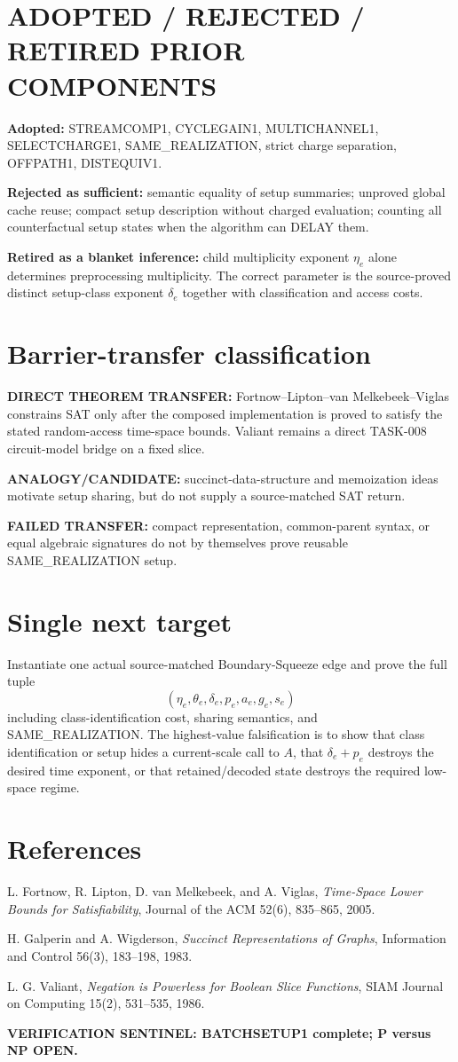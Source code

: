 \documentclass[11pt]{article}
\begin{document}
\section*{ADOPTED / REJECTED / RETIRED PRIOR COMPONENTS}
\textbf{Adopted:} STREAMCOMP1, CYCLEGAIN1, MULTICHANNEL1, SELECTCHARGE1, SAME\_REALIZATION, strict charge separation, OFFPATH1, DISTEQUIV1.

\textbf{Rejected as sufficient:} semantic equality of setup summaries; unproved global cache reuse; compact setup description without charged evaluation; counting all counterfactual setup states when the algorithm can DELAY them.

\textbf{Retired as a blanket inference:} child multiplicity exponent $\eta_e$ alone determines preprocessing multiplicity. The correct parameter is the source-proved distinct setup-class exponent $\delta_e$ together with classification and access costs.

\section*{Barrier-transfer classification}
\textbf{DIRECT THEOREM TRANSFER:} Fortnow--Lipton--van Melkebeek--Viglas constrains SAT only after the composed implementation is proved to satisfy the stated random-access time-space bounds. Valiant remains a direct TASK-008 circuit-model bridge on a fixed slice.

\textbf{ANALOGY/CANDIDATE:} succinct-data-structure and memoization ideas motivate setup sharing, but do not supply a source-matched SAT return.

\textbf{FAILED TRANSFER:} compact representation, common-parent syntax, or equal algebraic signatures do not by themselves prove reusable SAME\_REALIZATION setup.

\section*{Single next target}
Instantiate one actual source-matched Boundary-Squeeze edge and prove the full tuple
\[
(\eta_e,\theta_e,\delta_e,p_e,a_e,g_e,s_e)
\]
including class-identification cost, sharing semantics, and SAME\_REALIZATION. The highest-value falsification is to show that class identification or setup hides a current-scale call to $A$, that $\delta_e+p_e$ destroys the desired time exponent, or that retained/decoded state destroys the required low-space regime.

\section*{References}
L. Fortnow, R. Lipton, D. van Melkebeek, and A. Viglas, \emph{Time-Space Lower Bounds for Satisfiability}, Journal of the ACM 52(6), 835--865, 2005.

H. Galperin and A. Wigderson, \emph{Succinct Representations of Graphs}, Information and Control 56(3), 183--198, 1983.

L. G. Valiant, \emph{Negation is Powerless for Boolean Slice Functions}, SIAM Journal on Computing 15(2), 531--535, 1986.

\bigskip
\noindent\textbf{VERIFICATION SENTINEL: BATCHSETUP1 complete; P versus NP OPEN.}
\end{document}

